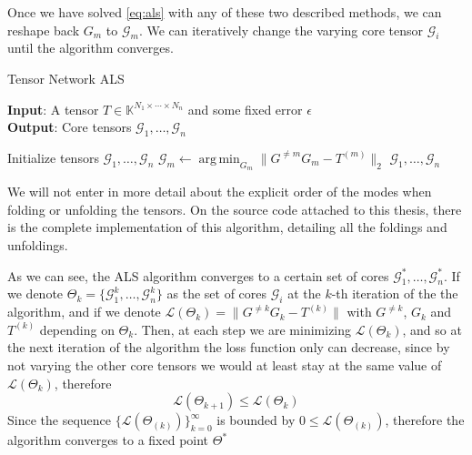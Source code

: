 \documentclass[11pt,a4paper,openright,oneside]{book}
\numberwithin{equation}{section}
\DeclareMathOperator*{\argmin}{arg\,min}
\begin{document}
{Once we have solved \eqref{eq:als} with any of these two described methods, we can reshape back $G_m$ to $\mathcal{G}_m$.
We can iteratively change the varying core tensor $\mathcal{G}_i$ until the algorithm converges.

\begin{algorithm}[H]
    \caption{Tensor Network ALS}

    \hspace*{\algorithmicindent} \textbf{Input}: A tensor $T \in \mathbb{K}^{N_1 \times \cdots \times N_n}$ and some fixed error $\epsilon$ \\
    \hspace*{\algorithmicindent} \textbf{Output}: Core tensors $\mathcal{G}_1, \dots, \mathcal{G}_n$ 

    \begin{algorithmic}[1]
        \State Initialize tensors $\mathcal{G}_1, \dots, \mathcal{G}_n$
            \State $\mathcal{G}_m \leftarrow \argmin_{G_m} \|G^{\neq m} G_m - T^{(m)}\|_2$
            \EndFor
        \EndWhile
        \State \Return $\mathcal{G}_1, \dots, \mathcal{G}_n$

    \end{algorithmic}

\end{algorithm}

We will not enter in more detail about the explicit order of the modes when folding or unfolding the tensors. On the source code
attached to this thesis, there is the complete implementation of this algorithm, detailing all the foldings and unfoldings.

As we can see, the ALS algorithm converges to a certain set of cores $\mathcal{G}_1^*, \dots, \mathcal{G}_n^*$. If we denote
$\Theta_k = \{\mathcal{G}_1^k, \dots, \mathcal{G}_n^k\}$ as the set of cores $\mathcal{G}_i$ at the $k$-th iteration of the the algorithm,
and if we denote $\mathcal{L}(\Theta_k) = \|G^{\neq k} G_k - T^{(k)}\|$ with $G^{\neq k}$, $G_k$ and $T^{(k)}$ depending on $\Theta_k$. 
Then, at each step we are minimizing $\mathcal{L}(\Theta_k)$, and so at the next iteration of the algorithm the loss function
only can decrease, since by not varying the other core tensors we would at least stay at the same value of $\mathcal{L}(\Theta_k)$, therefore
$$\mathcal{L}(\Theta_{k+1}) \leqslant \mathcal{L}(\Theta_k)$$
Since the sequence $\{\mathcal{L}(\Theta_{(k)})\}_{k=0}^\infty$ is bounded by $0 \leqslant \mathcal{L}(\Theta_{(k)})$, therefore
the algorithm converges to a fixed point $\Theta^*$

}
\end{document}
